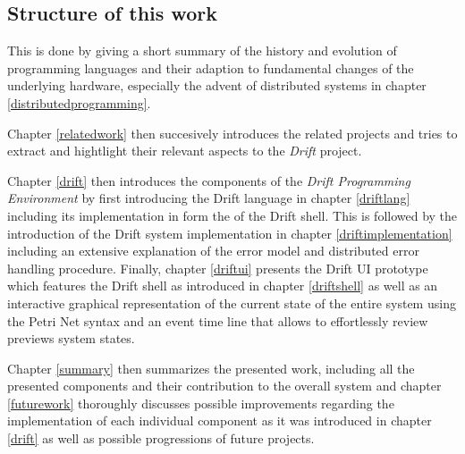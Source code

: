 \subsection{Structure of this work}
This is done by giving a short summary of the history and
evolution of programming languages and their adaption to
fundamental changes of the underlying hardware, especially the
advent of distributed systems in chapter \ref{distributedprogramming}.

Chapter \ref{relatedwork} then succesively introduces the related
projects and tries to extract and hightlight their relevant aspects
to the \textit{Drift} project.

Chapter \ref{drift} then introduces the components of the
\textit{Drift Programming Environment} by first introducing the
Drift language in chapter \ref{driftlang} including its implementation
in form the of the Drift shell. This is followed by the introduction
of the Drift system implementation in chapter
\ref{driftimplementation} including an extensive explanation of
the error model and distributed error handling procedure.
Finally, chapter \ref{driftui} presents the Drift UI prototype
which features the Drift shell as introduced in chapter \ref{driftshell}
as well as an interactive graphical representation of the
current state of the entire system using the Petri Net syntax
and an event time line that allows to effortlessly review previews
system states.

Chapter \ref{summary} then summarizes the presented work, including
all the presented components and their contribution to the overall
system and chapter \ref{futurework} thoroughly discusses possible
improvements regarding the implementation of each individual component
as it was introduced in chapter \ref{drift} as well as possible
progressions of future projects.

